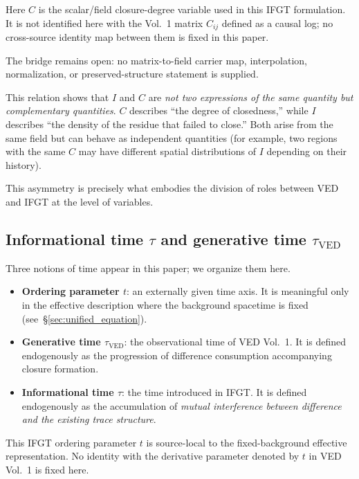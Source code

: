 Here $C$ is the scalar/field closure-degree variable used in this IFGT formulation. It is not identified here with the Vol.~1 matrix $C_{ij}$ defined as a causal log; no cross-source identity map between them is fixed in this paper.

The bridge remains open: no matrix-to-field carrier map, interpolation, normalization, or preserved-structure statement is supplied.

This relation shows that $I$ and $C$ are \emph{not two expressions of the same quantity but complementary quantities}. $C$ describes ``the degree of closedness,'' while $I$ describes ``the density of the residue that failed to close.'' Both arise from the same field but can behave as independent quantities (for example, two regions with the same $C$ may have different spatial distributions of $I$ depending on their history).

This asymmetry is precisely what embodies the division of roles between VED and IFGT at the level of variables.

\subsection{Informational time \texorpdfstring{$\tau$}{tau} and generative time \texorpdfstring{$\tau_{\mathrm{VED}}$}{tau-VED}}
\label{subsec:time}

Three notions of time appear in this paper; we organize them here.

\begin{itemize}
  \item \textbf{Ordering parameter $t$}: an externally given time axis. It is meaningful only in the effective description where the background spacetime is fixed (see~§\ref{sec:unified_equation}).
  \item \textbf{Generative time $\tau_{\mathrm{VED}}$}: the observational time of VED Vol.~1. It is defined endogenously as the progression of difference consumption accompanying closure formation.
  \item \textbf{Informational time $\tau$}: the time introduced in IFGT. It is defined endogenously as the accumulation of \emph{mutual interference between difference and the existing trace structure}.
\end{itemize}

This IFGT ordering parameter $t$ is source-local to the fixed-background effective representation. No identity with the derivative parameter denoted by $t$ in VED Vol.~1 is fixed here.

